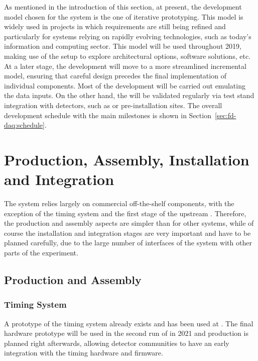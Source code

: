 As mentioned in the introduction of this section, at present, the development model chosen for the  system is the one of iterative prototyping.
This model is widely used in projects in which requirements are still
being refined and particularly for systems relying on rapidly evolving technologies, such as today's information and computing sector. 
This model will be used throughout 2019, making use of the  setup to explore architectural options, software solutions, etc.
At a later stage, the  development will move to a more streamlined incremental model, ensuring that careful design precedes the final implementation of individual components.
Most of the development will be carried out emulating the data inputs.
On the other hand, the  will be validated regularly via test stand integration with detectors, such as  or pre-installation sites.
The overall development schedule with the main  milestones is shown in Section~\ref{sec:fd-daq:schedule}.

\section{Production, Assembly, Installation and Integration}
\label{sec:sp-daq:production}

The  system relies largely on commercial off-the-shelf components, with the exception of the timing system and the first stage of the upstream .
Therefore, the production and assembly aspects are simpler than for other systems, while of course the installation and integration stages are very important and have to be planned carefully, due to the large number of interfaces of the  system with other parts of the experiment.

\subsection{Production and Assembly}
\subsubsection{Timing System}
A prototype of the timing system already exists and has been used at . The final hardware prototype will be used in the second run of  in 2021 and production is planned right afterwards, allowing detector communities to have an early integration with the timing hardware and firmware.

